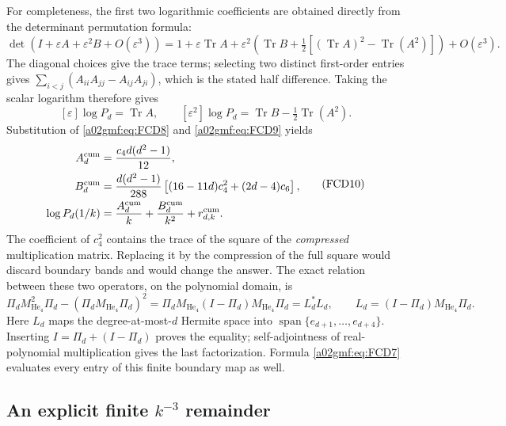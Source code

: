 \documentclass[11pt,a4paper]{article}
\begin{document}
For completeness, the first two logarithmic coefficients are obtained
directly from the determinant permutation formula:
\[
 \det(I+\varepsilon A+\varepsilon^2B+O(\varepsilon^3))
 =1+\varepsilon\operatorname{Tr}A+
 \varepsilon^2\left(\operatorname{Tr}B+
    \tfrac12[(\operatorname{Tr}A)^2-\operatorname{Tr}(A^2)]\right)
 +O(\varepsilon^3).
\]
The diagonal choices give the trace terms; selecting two distinct
first-order entries gives
\(\sum_{i<j}(A_{ii}A_{jj}-A_{ij}A_{ji})\), which is the stated half
difference. Taking the scalar logarithm therefore gives
\[
 [\varepsilon]\log P_d=\operatorname{Tr}A,\qquad
 [\varepsilon^2]\log P_d=\operatorname{Tr}B-\tfrac12\operatorname{Tr}(A^2).
\]
Substitution of \eqref{a02gmf:eq:FCD8} and \eqref{a02gmf:eq:FCD9} yields
\begin{equation}
 \begin{split}
 A_d^{\rm cum}&=\frac{c_4d(d^2-1)}{12},\\
 B_d^{\rm cum}
   &=\frac{d(d^2-1)}{288}
                \left[(16-11d)c_4^2+(2d-4)c_6\right],\\
 \log P_d(1/k)&=\frac{A_d^{\rm cum}}k
                         +\frac{B_d^{\rm cum}}{k^2}
                         +r_{d,k}^{\rm cum}.
 \end{split}
 \tag{FCD10}\label{a02gmf:eq:FCD10}
\end{equation}
The coefficient of \(c_4^2\) contains the trace of the
square of the \emph{compressed} multiplication matrix. Replacing it
by the compression of the full square would discard boundary bands and
would change the answer.
The exact relation between these two operators, on the polynomial domain,
is
\[
 \Pi_d M_{\operatorname{He}_4}^2\Pi_d
       -(\Pi_dM_{\operatorname{He}_4}\Pi_d)^2
   =\Pi_dM_{\operatorname{He}_4}(I-\Pi_d)
                             M_{\operatorname{He}_4}\Pi_d
   =L_d^*L_d,\qquad
 L_d=(I-\Pi_d)M_{\operatorname{He}_4}\Pi_d .
\]
Here \(L_d\) maps the degree-at-most-\(d\) Hermite space into
\(\operatorname{span}\{e_{d+1},\ldots,e_{d+4}\}\).
Inserting \(I=\Pi_d+(I-\Pi_d)\) proves the equality;
self-adjointness of real-polynomial multiplication gives the last
factorization. Formula \eqref{a02gmf:eq:FCD7} evaluates every entry of
this finite boundary map as well.

\subsection{An explicit finite \(k^{-3}\) remainder}
\end{document}
